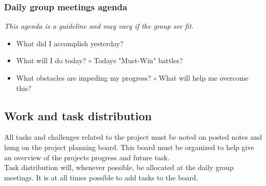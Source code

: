 \subsubsection{Daily group meetings agenda}
\textit{This agenda is a guideline and may vary if the group see fit.}
\begin{itemize}
\item What did I accomplish yesterday?
\item What will I do today?
\subitem $\circ$ Todays "Must-Win" battles?
\item What obstacles are impeding my progress?
\subitem $\circ$ What will help me overcome this?
\end{itemize}

\subsection{Work and task distribution}
All tasks and challenges related to the project must be noted on posted notes and hung on the project planning board. This board must be organized to help give an overview of the projects progress and future task.\\
Task distribution will, whenever possible, be allocated at the daily group meetings. It is at all times possible to add tasks to the board.\\

